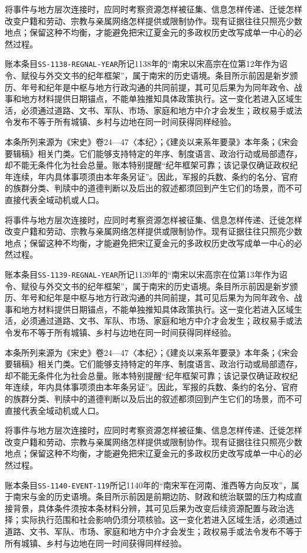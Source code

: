 将事件与地方层次连接时，应同时考察资源怎样被征集、信息怎样传递、迁徙怎样改变户籍和劳动、宗教与亲属网络怎样提供或限制协作。现有证据往往只照亮少数地点；保留这种不均衡，才能避免把宋辽夏金元的多政权历史改写成单一中心的必然过程。

账本条目\texttt{SS-1138-REGNAL-YEAR}所记1138年的“南宋以宋高宗在位第12年作为诏令、赋役与外交文书的纪年框架”，属于南宋的历史语境。条目所示前因是新岁颁历、年号和纪年是中枢与地方行政沟通的共同前提，其可见后果为为同年政令、战事和地方材料提供日期锚点，不能单独推知具体政策执行。这一变化若进入区域生活，必须通过道路、文书、军队、市场、家庭和地方中介才会发生；政权易手或法令发布不等于所有城镇、乡村与边地在同一时间获得同样经验。

本条所列来源为《宋史》卷24—47〈本纪〉；《建炎以来系年要录》本年条；《宋会要辑稿》相关门类。它们能够支持特定的年序、制度语言、政治行动或局部遗存，却不能无条件化为社会总量。账本特别提醒“纪年框架可靠；该记录仅确证政权纪年连续，年内具体事项须由本年条另证”。因此，军报的兵数、条约的名分、官府的族群分类、判牍中的道德判断以及后出的叙述都须回到产生它们的场景，而不可直接代表全域动机或人口。

将事件与地方层次连接时，应同时考察资源怎样被征集、信息怎样传递、迁徙怎样改变户籍和劳动、宗教与亲属网络怎样提供或限制协作。现有证据往往只照亮少数地点；保留这种不均衡，才能避免把宋辽夏金元的多政权历史改写成单一中心的必然过程。

账本条目\texttt{SS-1139-REGNAL-YEAR}所记1139年的“南宋以宋高宗在位第13年作为诏令、赋役与外交文书的纪年框架”，属于南宋的历史语境。条目所示前因是新岁颁历、年号和纪年是中枢与地方行政沟通的共同前提，其可见后果为为同年政令、战事和地方材料提供日期锚点，不能单独推知具体政策执行。这一变化若进入区域生活，必须通过道路、文书、军队、市场、家庭和地方中介才会发生；政权易手或法令发布不等于所有城镇、乡村与边地在同一时间获得同样经验。

本条所列来源为《宋史》卷24—47〈本纪〉；《建炎以来系年要录》本年条；《宋会要辑稿》相关门类。它们能够支持特定的年序、制度语言、政治行动或局部遗存，却不能无条件化为社会总量。账本特别提醒“纪年框架可靠；该记录仅确证政权纪年连续，年内具体事项须由本年条另证”。因此，军报的兵数、条约的名分、官府的族群分类、判牍中的道德判断以及后出的叙述都须回到产生它们的场景，而不可直接代表全域动机或人口。

将事件与地方层次连接时，应同时考察资源怎样被征集、信息怎样传递、迁徙怎样改变户籍和劳动、宗教与亲属网络怎样提供或限制协作。现有证据往往只照亮少数地点；保留这种不均衡，才能避免把宋辽夏金元的多政权历史改写成单一中心的必然过程。

账本条目\texttt{SS-1140-EVENT-119}所记1140年的“南宋军在河南、淮西等方向反攻”，属于南宋与金的历史语境。条目所示前因是前期边防、财政和统治联盟的压力构成直接背景，具体条件须按本条材料分辨，其可见后果为改变后续资源配置与政治选择；实际执行范围和社会影响仍须分项核验。这一变化若进入区域生活，必须通过道路、文书、军队、市场、家庭和地方中介才会发生；政权易手或法令发布不等于所有城镇、乡村与边地在同一时间获得同样经验。

